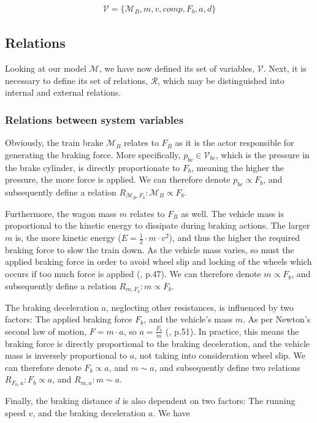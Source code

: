 \begin{align*}
{\mathcal{V}} = \{ {\mathcal{M}}_{B},m,v,comp,F_{b},a,d \}
\end{align*}

\subsection{Relations}
\label{sec:Relations}
\par\noindent
Looking at our model ${\mathcal{M}}$, we have now defined its set of variables, ${\mathcal{V}}$. Next, it is necessary to define its set of relations, ${\mathcal{R}}$, which may be distinguished into internal and external relations.

\subsubsection{Relations between system variables}
\label{sec:RelationsSystemVariables}
\par\noindent
Obviously, the train brake ${\mathcal{M}}_{B}$ relates to $F_{B}$ as it is the actor responsible for generating the braking force. More specifically, $p_{bc} \in {\mathcal{V}}_{bc}$, which is the pressure in the brake cylinder, is directly proportionate to $F_{b}$, meaning the higher the pressure, the more force is applied. We can therefore denote $p_{bc} \propto F_{b}$, and subsequently define a relation $R_{{\mathcal{M}}_{B},F_{b}}: {\mathcal{M}}_{B} \propto F_{b}$.
\par
Furthermore, the wagon mass $m$ relates to $F_{B}$ as well. The vehicle mass is proportional to the kinetic energy to dissipate during braking actions. The larger $m$ is, the more kinetic energy ($E=\frac{1}{2} \cdot m \cdot v^{2}$), and thus the higher the required braking force to slow the train down. As the vehicle mass varies, so must the applied braking force in order to avoid wheel slip and locking of the wheels which occurs if too much force is applied (\cite{Cruceanu2012}, p.47). We can therefore denote $m \propto F_{b}$, and subsequently define a relation $R_{m,F_{b}}: m \propto F_{b}$.
\par
The braking deceleration $a$, neglecting other resistances, is influenced by two factors: The applied braking force $F_{b}$, and the vehicle's mass $m$. As per Newton's second law of motion, $F=m \cdot a$, so $a=\frac{F_{b}}{m}$ (\cite{Cruceanu2012}, p.51). In practice, this means the braking force is directly proportional to the braking deceleration, and the vehicle mass is inversely proportional to $a$, not taking into consideration wheel slip. We can therefore denote $F_{b} \propto a$, and $m \sim a$, and subsequently define two relations $R_{F_{b},a}: F_{b} \propto a$, and $R_{m,a}: m \sim a$.
\par
Finally, the braking distance $d$ is also dependent on two factors: The running speed $v$, and the braking deceleration $a$.  We have 

